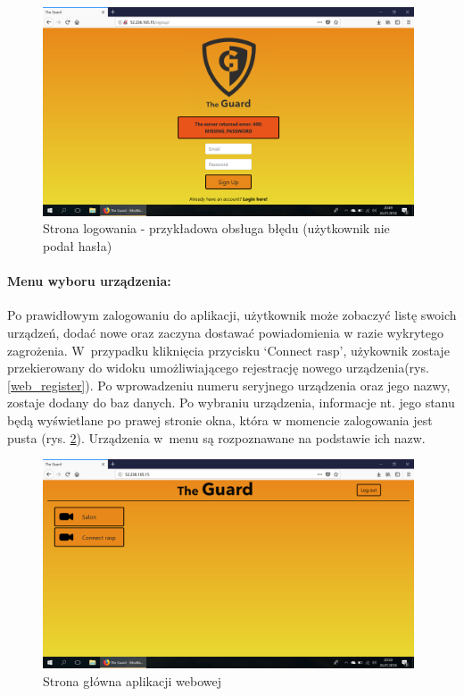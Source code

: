 \begin{figure}[ht]
	\centering
	\includegraphics[width=11cm]{web_screenshots/error.png}
	\caption{Strona logowania - przykładowa obsługa błędu (użytkownik nie podał hasła)}
	\label{web_login_error}
\end{figure}
\paragraph{Menu wyboru urządzenia:} Po prawidłowym zalogowaniu do aplikacji, użytkownik może zobaczyć listę swoich urządzeń, dodać nowe oraz zaczyna dostawać powiadomienia w razie wykrytego zagrożenia. W~przypadku kliknięcia przycisku `Connect rasp', użykownik zostaje przekierowany do widoku umożliwiającego rejestrację nowego urządzenia(rys. \ref{web_register}). Po wprowadzeniu numeru seryjnego urządzenia oraz jego nazwy, zostaje dodany do baz danych. Po wybraniu urządzenia, informacje nt. jego stanu będą wyświetlane po prawej stronie okna, która w momencie zalogowania jest pusta (rys. \ref{web_main_page}). Urządzenia w~menu są rozpoznawane na podstawie ich nazw. 

\begin{figure}[ht]
	\centering
	\includegraphics[width=11cm]{web_screenshots/main.png}
	\caption{Strona główna aplikacji webowej}
	\label{web_main_page}
\end{figure}


